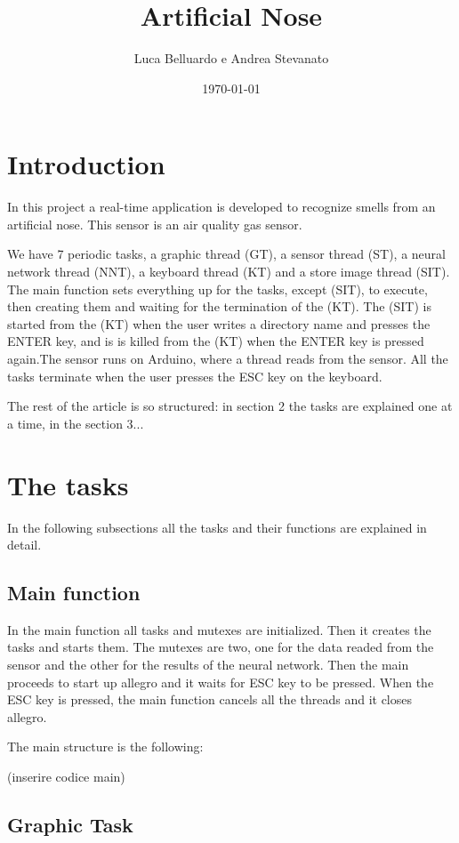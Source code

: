 \documentclass{article}
\title{Artificial Nose}
\author{Luca Belluardo e Andrea Stevanato}
\date{\today}
\begin{document}
\maketitle

\section{Introduction}
In this project a real-time application is developed to recognize smells from an artificial nose. This sensor is an air quality gas sensor.

We have 7 periodic tasks, a graphic thread (GT), a sensor thread (ST), a neural network thread (NNT), a keyboard thread (KT) and a store image thread (SIT). The main function sets everything up for the tasks, except (SIT), to execute, then creating them and waiting for the termination of the (KT). The (SIT) is started from the (KT) when the user writes a directory name and presses the ENTER key, and is is killed from the (KT) when the ENTER key is pressed again.The sensor runs on Arduino, where a thread reads from the sensor. All the tasks terminate when the user presses the ESC key on the keyboard.

The rest of the article is so structured: in section 2 the tasks are explained one at a time, in the section 3...

\section{The tasks}
In the following subsections all the tasks and their functions are explained in detail.

\subsection{Main function}
In the main function all tasks and mutexes are initialized. Then it creates the tasks and starts them. The mutexes are two, one for the data readed from the sensor and the other for the results of the neural network. Then the main proceeds to start up allegro and it waits for ESC key to be pressed. When the ESC key is pressed, the main function cancels all the threads and it closes allegro.

The main structure is the following: 

                         (inserire codice main)
\subsection{Graphic Task}
\end{document}
